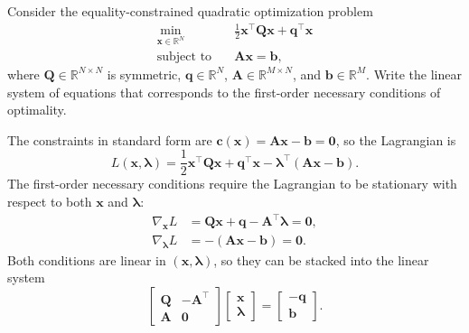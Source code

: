 \begin{exercise} %
    
    Consider the equality-constrained quadratic optimization problem
    \[
    \begin{aligned}
        \min_{\mathbf{x} \in \mathbb{R}^N} \quad & \frac{1}{2} \mathbf{x}^\top \mathbf{Q} \mathbf{x} + \mathbf{q}^\top \mathbf{x} \\
        \text{subject to} \quad & \mathbf{A}\mathbf{x} = \mathbf{b},
    \end{aligned}
    \]
    where $\mathbf{Q} \in \mathbb{R}^{N \times N}$ is symmetric, $\mathbf{q} \in \mathbb{R}^N$, $\mathbf{A} \in \mathbb{R}^{M \times N}$, and $\mathbf{b} \in \mathbb{R}^M$. Write the linear system of equations that corresponds to the first-order necessary conditions of optimality.
    
\end{exercise}

\begin{solution}
    
    The constraints in standard form are $\mathbf{c}(\mathbf{x}) = \mathbf{A}\mathbf{x} - \mathbf{b} = \mathbf{0}$, so the Lagrangian is
    \[
        L(\mathbf{x}, \boldsymbol{\lambda}) = \frac{1}{2} \mathbf{x}^\top \mathbf{Q} \mathbf{x} + \mathbf{q}^\top \mathbf{x} - \boldsymbol{\lambda}^\top (\mathbf{A}\mathbf{x} - \mathbf{b}).
    \]
    The first-order necessary conditions require the Lagrangian to be stationary with respect to both $\mathbf{x}$ and $\boldsymbol{\lambda}$:
    \begin{align*}
        \nabla_{\mathbf{x}} L &= \mathbf{Q}\mathbf{x} + \mathbf{q} - \mathbf{A}^\top \boldsymbol{\lambda} = \mathbf{0}, \\
        \nabla_{\boldsymbol{\lambda}} L &= -(\mathbf{A}\mathbf{x} - \mathbf{b}) = \mathbf{0}.
    \end{align*}
    Both conditions are linear in $(\mathbf{x}, \boldsymbol{\lambda})$, so they can be stacked into the linear system
    \[
        \begin{bmatrix} \mathbf{Q} & -\mathbf{A}^\top \\ \mathbf{A} & \mathbf{0} \end{bmatrix}
        \begin{bmatrix} \mathbf{x} \\ \boldsymbol{\lambda} \end{bmatrix}
        =
        \begin{bmatrix} -\mathbf{q} \\ \mathbf{b} \end{bmatrix}.
    \]
    
\end{solution}



